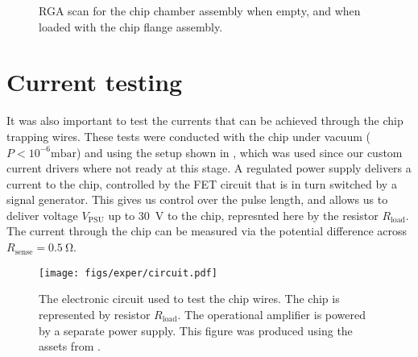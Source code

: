  \begin{figure}[htb]
  \centering
  \caption{RGA scan for the chip chamber assembly when empty, and when loaded
  with the chip flange assembly.}
  \label{exper:fig:rga}
\end{figure}


\section{Current testing}
\label{exper:current}

It was also important to test the currents that can be achieved through the
chip trapping wires. These tests were conducted with the chip under vacuum
($P<10^{-6}\si{\milli\bar}$) and using the setup shown in
, which was used since our custom current drivers
where not ready at this stage. A regulated power supply delivers a current to
the chip, controlled by the FET circuit that is in turn switched by a signal
generator. This gives us control over the pulse length, and allows us to
deliver voltage $V_\text{PSU}$ up to \SI{30}{\volt} to the chip, represnted
here by the resistor $R_\text{load}$. The current through the chip can be
measured via the potential difference across $R_\text{sense} = \SI{0.5}{\ohm}$.

\begin{figure}[htb]
  \centering
  \texttt{[image: figs/exper/circuit.pdf]}
  \caption{The electronic circuit used to test the chip wires. The chip is
  represented by resistor $R_\text{load}$. The operational amplifier is powered
  by a separate power supply. This figure was produced using the assets from
  .}
  \label{exper:fig:curtest}
\end{figure}

